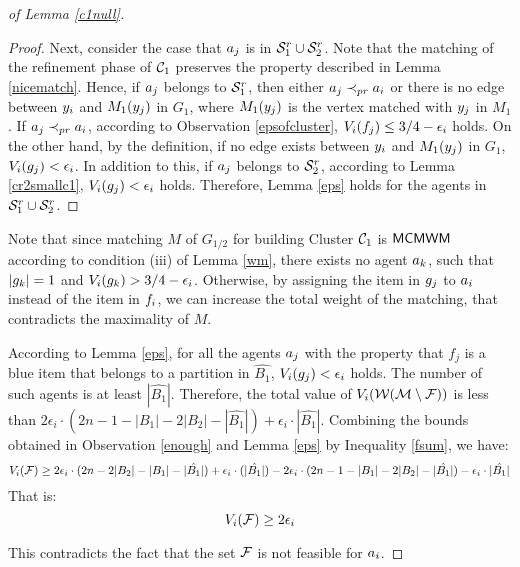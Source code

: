 \begin{proof}[of Lemma \ref{c1null}]
\begin{proof}
Next, consider the case that $a_j$ is in $\mathcal{S}_1^r \cup \mathcal{S}_2^r$. Note that the matching of the refinement phase of $\mathcal{C}_1$ preserves the property described in Lemma \ref{nicematch}. Hence, if $a_j$ belongs to $\mathcal{S}_1^r$, then either $a_j \prec_{pr} a_i$ or there is no edge between $y_i$ and $M_1(y_j)$ in $G_1$, where $M_1(y_j)$ is the vertex matched with $y_j$ in $M_1$. If $a_j \prec_{pr} a_i$, according to Observation \ref{epsofcluster}, $V_i(f_j) \leq 3/4-\epsilon_i$ holds. On the other hand, by the definition, if no edge exists between $y_i$ and  $M_1(y_j)$ in $G_1$, $V_i(g_j)<\epsilon_i$. 
In addition to this, if $a_j$ belongs to $\mathcal{S}_2^r$, according to Lemma \ref{cr2smallc1}, $V_i(g_j)< \epsilon_i$ holds. 
Therefore, Lemma \ref{eps} holds for the agents in $\mathcal{S}_1^r \cup \mathcal{S}_2^r$.

\end{proof}

Note that since matching $M$ of $G_{1/2}$ for building Cluster $\mathcal{C}_1$ is $\textsf{MCMWM}$ according to condition (iii) of Lemma \ref{wm}, there exists no agent $a_k$, such that $|g_k| = 1$ and $V_i(g_k) > 3/4 - \epsilon_i$. Otherwise, by assigning the item in $g_j$ to $a_i$ instead of the item in $f_i$, we can increase the total weight of the matching, that contradicts the maximality of $M$.

According to Lemma \ref{eps}, for all the agents $a_j$ with the property that $f_j$ is a blue item that belongs to a partition in $\hat{B_1}$, $V_i(g_j)< \epsilon_i$ holds. 
The number of such agents is at least $|\hat{B_1}|$. Therefore, the total value of $V_i(\mathcal{W}(\mathcal{M} \setminus \mathcal{F}))$ is less than $2\epsilon_i \cdot (2n - 1 - |B_1| - 2|B_2|- |\hat{B_1}|) + \epsilon_i \cdot |\hat{B_1}|$. Combining the bounds obtained in Observation \ref{enough} and Lemma \ref{eps} by Inequality \eqref{fsum}, we have:
$$ V_i({\mathcal{F}}) \geq 2\epsilon_i \cdot(2n -2|B_2| - |B_1| -  |\hat{B_1}|) + \epsilon_i \cdot(|\hat{B_1}|) -  2\epsilon_i \cdot (2n - 1 - |B_1| - 2|B_2|- |\hat{B_1}|) - \epsilon_i \cdot |\hat{B_1}|$$
That is:
$$ V_i({\mathcal{F}}) \geq 2\epsilon_i$$

This contradicts the fact that the set $\mathcal{F}$ is not feasible for $a_i$.


\begin{comment}
Now, we observe the algorithm, from the viewpoint of $\agent_i$. For each agent $\agent_j$, consider $\firstset_j$ and $\secondset_j$ as two slots that must be filled by proper set of items during the algorithm. In the viewpoint of $\agent_i$, during the algorithm, each slot is filled, either with a single blue item, or a set of white items with value at most $\epsilon$ for $\agent_i$ ( if the set $\secondset_j$ is not feasible for $\agent_i$ ) or with a set of items that is worth at most $2\epsilon_i$ for $\agent_i$ ( if the set $S$ was feasible for $\agent_i$ in the second phase, or the slots was filled in the clustering phase by merging two vertices). 


\end{comment}
\end{proof}
